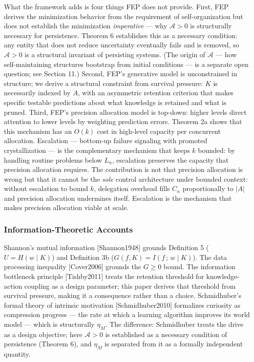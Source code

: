 \documentclass[
]{article}
\begin{document}
What the framework adds is four things FEP does not provide. First, FEP
derives the minimization behavior from the requirement of
self-organization but does not establish the minimization
\emph{imperative} --- why \(\mathcal{A} > 0\) is structurally necessary
for persistence. Theorem 6 establishes this as a necessary condition:
any entity that does not reduce uncertainty eventually fails and is
removed, so \(\mathcal{A} > 0\) is a structural invariant of persisting
systems. (The origin of \(\mathcal{A}\) --- how self-maintaining
structures bootstrap from initial conditions --- is a separate open
question; see Section 11.) Second, FEP's
generative model is unconstrained in structure; we derive a structural
constraint from survival pressure: \(K\) is necessarily indexed by
\(A\), with an asymmetric retention criterion that makes specific
testable predictions about what knowledge is retained and what is
pruned. Third, FEP's precision allocation model is top-down: higher
levels direct attention to lower levels by weighting prediction errors.
Theorem 2a shows that this mechanism has an \(O(k)\) cost in high-level
capacity per concurrent allocation. Escalation --- bottom-up failure
signaling with promoted crystallization --- is the complementary
mechanism that keeps \(k\) bounded: by handling routine problems below
\(L_n\), escalation preserves the capacity that precision allocation
requires. The contribution is not that precision allocation is wrong
but that it cannot be the \emph{sole} control architecture under bounded
context: without escalation to bound \(k\), delegation overhead fills
\(C_n\) proportionally to \(|A|\) and precision allocation undermines
itself. Escalation is the mechanism that makes precision allocation
viable at scale.

\subsubsection{Information-Theoretic
Accounts}\label{information-theoretic-accounts}

Shannon's mutual information {[}Shannon1948{]} grounds Definition 5
(\(U = H(w \mid K)\)) and Definition 3b
(\(G(f, K) = I(f\,;\,w \mid K)\)). The data processing inequality
{[}Cover2006{]} grounds the \(G \geq 0\) bound. The information
bottleneck principle {[}Tishby2011{]} treats the retention threshold for
knowledge-action coupling as a design parameter; this paper derives that
threshold from survival pressure, making it a consequence rather than a
choice. Schmidhuber's formal theory of intrinsic motivation
{[}Schmidhuber2010{]} formalizes curiosity as compression progress ---
the rate at which a learning algorithm improves its world model ---
which is structurally \(\eta_M\). The difference: Schmidhuber treats the
drive as a design objective; here \(\mathcal{A} > 0\) is established as
a necessary condition of persistence (Theorem 6), and \(\eta_M\) is
separated from it as a formally independent quantity.
\end{document}
